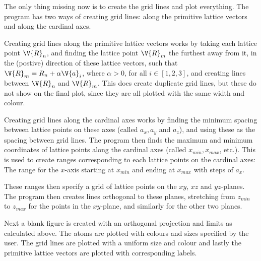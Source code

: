 \documentclass[main.tex]{subfiles}
\begin{document}
	The only thing missing now is to create the grid lines and plot everything. The program has two ways of creating grid lines: along the primitive lattice vectors and along the cardinal axes.
	
	Creating grid lines along the primitive lattice vectors works by taking each lattice point $ \V{R}_n $, and finding the lattice point $ \V{R}_m $ the furthest away from it, in the (postive) direction of these lattice vectors, such that $ \V{R}_m = R_n + \alpha \V{a}_i $, where $ \alpha > 0 $, for all $ i \in [1,2,3] $, and creating lines between $ \V{R}_n $ and $ \V{R}_m $. This does create duplicate grid lines, but these do not show on the final plot, since they are all plotted with the same width and colour.
	
	Creating grid lines along the cardinal axes works by finding the minimum spacing between lattice points on these axes (called $ a_x, a_y$ and $ a_z $), and using these as the spacing between grid lines. The program then finds the maximum and minimum coordinates of lattice points along the cardinal axes (called $x_{min}, x_{max}$, etc.). This is used to create ranges corresponding to each lattice points on the cardinal axes: The range for the $ x $-axis starting at $ x_{min} $  and ending at $ x_{max} $ with steps of $ a_x $.
	
	These ranges then specify a grid of lattice points on the $ xy$, $ xz $ and $ yz $-planes. The program then creates lines orthogonal to these planes, stretching from $ z_{min} $ to $ z_{max} $ for the points in the $ xy $-plane, and similarly for the other two planes.
	
	Next a blank figure is created with an orthogonal projection and limits as calculated above. The atoms are plotted with colours and sizes specified by the user. The grid lines are plotted with a uniform size and colour and lastly the primitive lattice vectors are plotted with corresponding labels.
\end{document}
